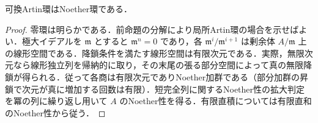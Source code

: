 \begin{prop}[可換Artin環のNoether性]
可換Artin環はNoether環である．
\end{prop}
\begin{proof}
零環は明らかである．前命題の分解により局所Artin環の場合を示せばよい．極大イデアルを $\mathfrak m$ とすると $\mathfrak m^n=0$ であり，各 $\mathfrak m^i/\mathfrak m^{i+1}$ は剰余体 $A/\mathfrak m$ 上の線形空間である．降鎖条件を満たす線形空間は有限次元である．実際，無限次元なら線形独立列を帰納的に取り，その末尾の張る部分空間によって真の無限降鎖が得られる．従って各商は有限次元でありNoether加群である（部分加群の昇鎖で次元が真に増加する回数は有限）．短完全列に関するNoether性の拡大判定を冪の列に繰り返し用いて $A$ のNoether性を得る．有限直積については有限直和のNoether性から従う．
\end{proof}
